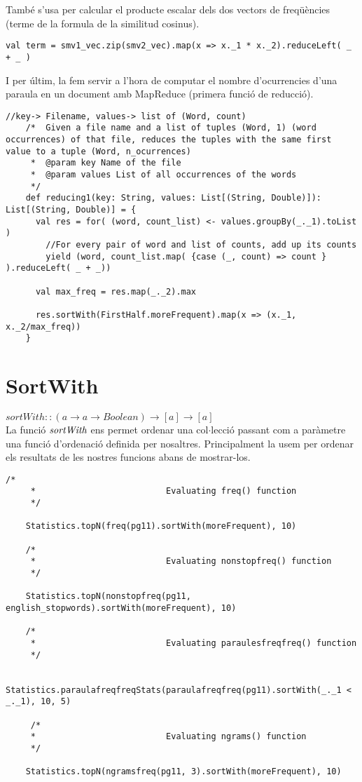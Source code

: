 \documentclass{report}
\begin{document}
També s'usa per calcular el producte escalar dels dos vectors de freqüències (terme de la formula de la similitud cosinus).

\begin{lstlisting}[style=scalaHighlight]
    val term = smv1_vec.zip(smv2_vec).map(x => x._1 * x._2).reduceLeft( _ + _ )   
\end{lstlisting}

I per últim, la fem servir a l'hora de computar el nombre d'ocurrencies d'una paraula en un document amb MapReduce (primera funció de reducció).

\begin{lstlisting}[style=scalaHighlight]
//key-> Filename, values-> list of (Word, count)
    /* 	Given a file name and a list of tuples (Word, 1) (word occurrences) of that file, reduces the tuples with the same first value to a tuple (Word, n_ocurrences)
     * 	@param key Name of the file
     * 	@param values List of all occurrences of the words
     */
    def reducing1(key: String, values: List[(String, Double)]): List[(String, Double)] = {
      val res = for( (word, count_list) <- values.groupBy(_._1).toList )
        //For every pair of word and list of counts, add up its counts
        yield (word, count_list.map( {case (_, count) => count } ).reduceLeft( _ + _))

      val max_freq = res.map(_._2).max

      res.sortWith(FirstHalf.moreFrequent).map(x => (x._1, x._2/max_freq))
    }
\end{lstlisting}

\newpage

\section{SortWith}

$ sortWith :: (a \rightarrow a \rightarrow Boolean) \rightarrow [a] \rightarrow [a] $ \\

La funció $ \emph{sortWith} $ ens permet ordenar una col$\cdot$lecció passant com a paràmetre una funció d'ordenació definida per nosaltres. Principalment la usem per ordenar els resultats de les nostres funcions abans de mostrar-los.

\begin{lstlisting}[style=scalaHighlight]
/*
     * 							Evaluating freq() function
     */

    Statistics.topN(freq(pg11).sortWith(moreFrequent), 10)

    /*
     * 							Evaluating nonstopfreq() function
     */

    Statistics.topN(nonstopfreq(pg11, english_stopwords).sortWith(moreFrequent), 10)

    /*
     * 							Evaluating paraulesfreqfreq() function
     */

    Statistics.paraulafreqfreqStats(paraulafreqfreq(pg11).sortWith(_._1 < _._1), 10, 5)

     /*
     * 							Evaluating ngrams() function
     */

    Statistics.topN(ngramsfreq(pg11, 3).sortWith(moreFrequent), 10)
\end{lstlisting}
\end{document}
